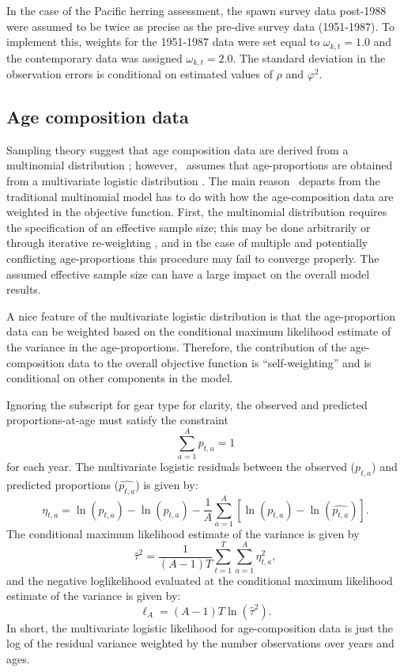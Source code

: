 In the case of the Pacific herring assessment, the spawn survey data post-1988 were assumed to be twice as precise as the pre-dive survey data (1951-1987).  To implement this, weights for the 1951-1987 data were set equal to $\omega_{k,t}=1.0$ and the contemporary data was assigned $\omega_{k,t}=2.0$.  The standard deviation in the observation errors is conditional on estimated values of $\rho$ and $\varphi^2$.


\subsection{Age composition data}\label{agecomps}
Sampling theory suggest that age composition data are derived from a multinomial distribution \citep{fournier1982general}; however, \iscam\ assumes that age-proportions are obtained from a multivariate logistic distribution \citep{schnute1995influence,richards1997visualizing}.  The main reason \iscam\ departs from the traditional multinomial model has to do with how the age-composition data are weighted in the objective function.  First, the multinomial distribution requires the specification of an effective sample size; this may be done arbitrarily or through iterative re-weighting \citep{MCALLISTER1997,gavaris2002sif}, and in the case of multiple and potentially conflicting age-proportions this procedure may fail to converge properly.  The assumed effective sample size can have a large impact on the overall model results.  

A nice feature of the multivariate logistic distribution is that the age-proportion data can be weighted based on the conditional maximum likelihood estimate of the variance in the age-proportions.  Therefore, the contribution of the age-composition data to the overall objective function is ``self-weighting'' and is conditional on other components in the model.

Ignoring the subscript for gear type for clarity, the observed and predicted proportions-at-age must satisfy the constraint 
\[
 \sum_{a=1}^A p_{t,a} = 1
\]
for each year. The multivariate logistic residuals between the observed ($p_{t,a}$) and predicted proportions ($\widehat{p_{t,a}}$) is given by:
\begin{equation}\label{eq7}
\eta_{t,a}=\ln(p_{t,a})-\ln(\widehat{p_{t,a}})-\frac{1}{A}\sum_{a=1}^A\left[\ln(p_{t,a})-\ln(\widehat{p_{t,a}}) \right].
\end{equation}
The conditional maximum likelihood estimate of the variance is given by
\[
\widehat{\tau}^2=\frac{1}{(A-1)T}\sum_{t=1}^T\sum_{a=1}^A \eta_{t,a}^2,
\]
and the negative loglikelihood evaluated at the conditional maximum likelihood estimate of the variance is given by:
\begin{equation}\label{eq8}
	\ell_A = (A-1)T \ln(\widehat{\tau}^2).
\end{equation}
In short, the multivariate logistic likelihood for age-composition data is just the log of the residual variance weighted by the number observations over years and ages.

